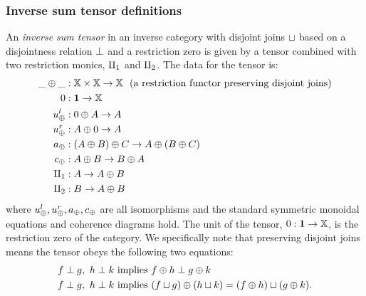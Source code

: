 \subsubsection{Inverse sum tensor definitions} %
\label{ssub:inverse_sum_tensor_definitions}
\label{sub:inverse_sum_tensor}
\begin{definition}\label{def:inverse_sum_tensor}
  An \emph{inverse sum tensor} in an inverse category \X with disjoint joins $\sqcup$ based
  on a disjointness relation $\perp$ and a restriction zero
  is given by a tensor combined with two restriction monics, $\amalg_{1}$ and $\amalg_{2}$. The data for the
  tensor is:
 \begin{align*}
    \_ \oplus \_ &: \mathbb{X} \times \mathbb{X} \to \mathbb{X}\ \ \text{(a restriction functor preserving disjoint joins)}\\
    0 &: \boldsymbol{1}\to \mathbb{X} \\
    u_{\oplus}^l &: 0 \oplus A \to A\\
    u_{\oplus}^r &: A \oplus 0 \to A\\
    a_\oplus &: (A \oplus B) \oplus C \to A \oplus (B \oplus C) \\
    c_\oplus &: A \oplus B \to B \oplus A\\
    \amalg_{1} &: A \to A \oplus B\\
    \amalg_{2} &: B \to A \oplus B
  \end{align*}
  where $u_{\oplus}^l, u_{\oplus}^r, a_\oplus, c_\oplus$ are all isomorphisms and the standard symmetric monoidal
  equations and coherence diagrams hold. The unit of the tensor, $0: \boldsymbol{1}\to \mathbb{X}$, is the
  restriction zero of the category. We specifically note that preserving disjoint joins means the
  tensor obeys the following two equations:
  \begin{align}
    f \perp g, \ h \perp k&\text{ implies } f\oplus h \perp g \oplus k
    \label{eq:invsum_preserve_perp}\\
    f \perp g, \ h \perp k &\text{ implies } (f\sqcup g)\oplus(h\sqcup k) = (f \oplus h )\sqcup (g\oplus k).
    \label{eq:invsum_preserve_join}
  \end{align}

\end{definition}




